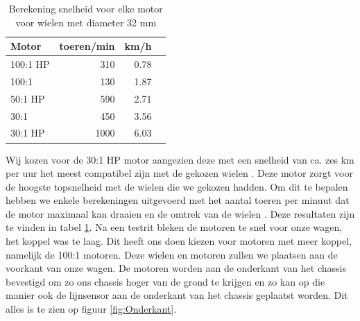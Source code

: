 \documentclass[a4paper,kulak]{kulakarticle}
\begin{document}
\begin{table}
	\centering
	
	\begin{tabular}{|l|r|r|r|}\hline
		  \textbf{Motor}&	\textbf{toeren/min} &	\textbf{km/h}	\\\hline
		100:1 HP&	310&	0.78\\\hline
		100:1&	130&	1.87 	\\\hline
		50:1 HP&	590&	2.71 \\\hline
		30:1&	450&	3.56	\\\hline
		30:1 HP&	1000&	6.03 	\\\hline
	\end{tabular}
	\caption{Berekening snelheid voor elke motor voor wielen met diameter 32 mm}\label{MotorenTab}

\end{table}
Wij kozen voor de 30:1 HP motor aangezien deze met een snelheid van ca. zes km per uur het meest compatibel zijn met de gekozen wielen . Deze motor zorgt voor de hoogste topsnelheid met de wielen die we gekozen hadden. Om dit te bepalen hebben we enkele berekeningen uitgevoerd met het aantal toeren per minuut dat de motor maximaal kan draaien en de omtrek van de wielen \cite{converter}. Deze resultaten zijn te vinden in tabel \ref{MotorenTab}. Na een testrit bleken de motoren te snel voor onze wagen, het koppel was te laag. Dit heeft ons doen kiezen voor motoren met meer koppel, namelijk de 100:1 motoren. Deze wielen en motoren zullen we plaatsen aan de voorkant van onze wagen. De motoren worden aan de onderkant van het chassis bevestigd om zo ons chassis hoger van de grond te krijgen en zo kan op die manier ook de lijnsensor aan de onderkant van het chassis geplaatst worden. Dit alles is te zien op figuur \ref{fig:Onderkant}.  \newline 
\end{document}
